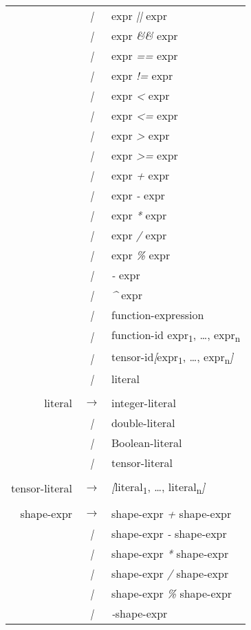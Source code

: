 \begin{tt}
{\begin{center}
\begin{longtable}{r c l}
& \emph{|} & expr \emph{||} expr \\
& \emph{|} & expr \emph{\&\&} expr \\
& \emph{|} & expr \emph{==} expr \\
& \emph{|} & expr \emph{!=} expr \\
& \emph{|} & expr \emph{<} expr \\
& \emph{|} & expr \emph{<=} expr \\
& \emph{|} & expr \emph{>} expr \\
& \emph{|} & expr \emph{>=} expr \\
& \emph{|} & expr \emph{+} expr \\
& \emph{|} & expr \emph{-} expr \\
& \emph{|} & expr \emph{*} expr \\
& \emph{|} & expr \emph{/} expr \\
& \emph{|} & expr \emph{\%} expr \\
& \emph{|} & \emph{-} expr \\
& \emph{|} & \emph{\^} expr \\
& \emph{|} & function-expression \\
& \emph{|} & function-id expr\textsubscript{1}, \ldots, expr\textsubscript{n} \\
& \emph{|} & tensor-id\emph{[}expr\textsubscript{1}, \ldots, expr\textsubscript{n}\emph{]} \\
& \emph{|} & literal \\
& & \\
literal & $\rightarrow$ &  integer-literal \\
& \emph{|} & double-literal \\
& \emph{|} & Boolean-literal \\
& \emph{|} & tensor-literal \\
& & \\
tensor-literal & $\rightarrow$ & \emph{[}literal\textsubscript{1}, \ldots, literal\textsubscript{n}\emph{]} \\
& & \\
shape-expr & $\rightarrow$ & shape-expr \emph{+} shape-expr \\
& \emph{|} & shape-expr \emph{-} shape-expr \\
& \emph{|} & shape-expr \emph{*} shape-expr \\
& \emph{|} & shape-expr \emph{/} shape-expr \\
& \emph{|} & shape-expr \emph{\%} shape-expr \\
& \emph{|} & \emph{-}shape-expr \\

\end{longtable}
\end{center}}
\end{tt}
